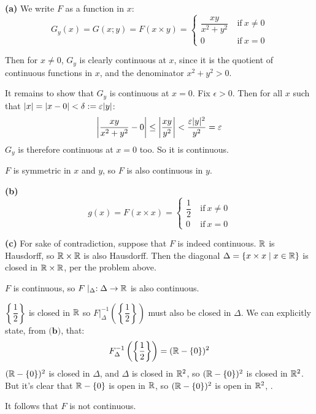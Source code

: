 \documentclass[a4paper, 12pt]{article}
\begin{document}
\begin{solution}
    \textbf{(a)} We write $F$ as a function in $x$:
    \begin{equation*}
    G_y(x) = G(x; y) = F(x \times y) = \begin{cases}
        \dfrac{xy}{x^2 + y^2} & \:\text{if}\: x \neq 0 \\
        0 & \:\text{if}\: x = 0
    \end{cases}
    \end{equation*}

    Then for $x \neq 0$, $G_y$ is clearly continuous at $x$, since it is the quotient of continuous functions in $x$, and the denominator $x^2 + y^2 > 0$.

    It remains to show that $G_y$ is continuous at $x = 0$. Fix $\epsilon > 0$. Then for all $x$ such that $\abs{x} = \abs{x - 0} < \delta := \epsilon \abs{y}$:
    \begin{equation*}
    \abs*{\dfrac{xy}{x^2 + y^2} - 0} \leq \abs*{\dfrac{xy}{y^2}} < \dfrac{\epsilon \abs{y}^2}{y^2} = \epsilon
    \end{equation*}
    $G_y$ is therefore continuous at $x = 0$ too. So it is continuous.

    $F$ is symmetric in $x$ and $y$, so $F$ is also continuous in $y$.

    \textbf{(b)}
    \begin{equation*}
    g(x) = F(x \times x) = \begin{cases}
    \dfrac{1}{2} & \:\text{if}\:  x \neq 0 \\
    0 & \:\text{if}\: x = 0
    \end{cases}
    \end{equation*}

    \textbf{(c)} For sake of contradiction, suppose that $F$ is indeed continuous. $\bbr$ is Hausdorff, so $\bbr \times \bbr$ is also Hausdorff. Then the diagonal $\Delta = \{x \times x \mid x \in \bbr\}$ is closed in $\bbr \times \bbr$, per the problem above.

    $F$ is continuous, so $F\mid_\Delta: \Delta \to \bbr$ is also continuous.
    
    $\left\{\dfrac{1}{2}\right\}$ is closed in $\bbr$ so $F|_\Delta^{-1}\left(\left\{\dfrac{1}{2}\right\}\right)$ must also be closed in $\Delta$. We can explicitly state, from $\textbf{(b)}$, that:
    \begin{equation*}
        F_\Delta^{-1}\left(\left\{\dfrac{1}{2}\right\}\right) = (\bbr - \{0\})^2
    \end{equation*}
    $(\bbr - \{0\})^2$ is closed in $\Delta$, and $\Delta $ is closed in $\bbr^2$, so $(\bbr - \{0\})^2$ is closed in $\bbr^2$. But it's clear that $\bbr-\{0\}$ is open in $\bbr$, so $(\bbr - \{0\})^2$ is open in $\bbr^2$, \contra.

    It follows that $F$ is not continuous.
\end{solution}
\end{document}
